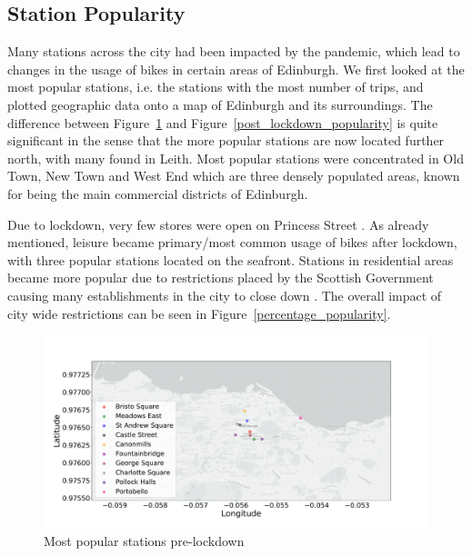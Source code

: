\documentclass[11pt,a4paper]{article}
\begin{document}
\subsection{Station Popularity}
\vspace{-5mm}
Many stations across the city had been impacted by the pandemic, which lead to changes in the usage of bikes in certain areas of Edinburgh. We first looked at the most popular stations, i.e. the stations with the most number of trips, and plotted geographic data onto a map of Edinburgh and its surroundings. The difference between Figure~\ref{pre_lockdown_popularity} and Figure~\ref{post_lockdown_popularity} is quite significant in the sense that the more popular stations are now located further north, with many found in Leith. Most popular stations were concentrated in Old Town, New Town and West End which are three densely populated areas, known for being the main commercial districts of Edinburgh. 
\par 
Due to lockdown, very few stores were open on Princess Street \cite{stores_princess}. As already mentioned, leisure became primary/most common usage of bikes after lockdown, with three popular stations located on the seafront. Stations in residential areas became more popular due to restrictions placed by the Scottish Government causing many establishments in the city to close down \cite{establishments}. The overall impact of city wide restrictions can be seen in Figure~\ref{percentage_popularity}.
\begin{figure}[h]
    \centering
    \includegraphics[width=\linewidth]{datasets/popular_stations_pre_lockdown.pdf}
    \vspace*{-1.3cm}
    \caption{Most popular stations pre-lockdown}
    \label{pre_lockdown_popularity}
\end{figure}
\vspace*{-2cm}
\end{document}
